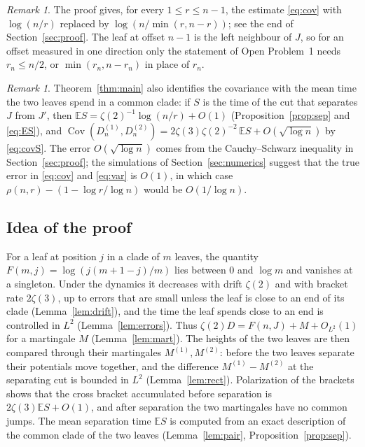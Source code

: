 \documentclass[11pt]{amsart}
\theoremstyle{remark}
\newtheorem{remark}[theorem]{Remark}
\numberwithin{equation}{section}
\newcommand{\E}{\mathbb E}
\newcommand{\Cov}{\operatorname{Cov}}
\begin{document}
\begin{remark}\label{rem:oriented}
The proof gives, for every $1\le r\le n-1$, the estimate \eqref{eq:cov} with $\log(n/r)$ replaced by $\log(n/\min(r,n-r))$; see the end of Section~\ref{sec:proof}. The leaf at offset $n-1$ is the left neighbour of $J$, so for an offset measured in one direction only the statement of Open Problem~1 needs $r_n\le n/2$, or $\min(r_n,n-r_n)$ in place of $r_n$.
\end{remark}

\begin{remark}
Theorem~\ref{thm:main} also identifies the covariance with the mean time the two leaves spend in a common clade: if $S$ is the time of the cut that separates $J$ from $J'$, then $\E S=\zeta(2)^{-1}\log(n/r)+O(1)$ (Proposition~\ref{prop:sep} and \eqref{eq:ES}), and $\Cov(D^{(1)}_n,D^{(2)}_n)=2\zeta(3)\zeta(2)^{-2}\,\E S+O(\sqrt{\log n})$ by \eqref{eq:covS}. The error $O(\sqrt{\log n})$ comes from the Cauchy--Schwarz inequality in Section~\ref{sec:proof}; the simulations of Section~\ref{sec:numerics} suggest that the true error in \eqref{eq:cov} and \eqref{eq:var} is $O(1)$, in which case $\rho(n,r)-(1-\log r/\log n)$ would be $O(1/\log n)$.
\end{remark}

\subsection*{Idea of the proof}
For a leaf at position $j$ in a clade of $m$ leaves, the quantity $F(m,j)=\log(j(m+1-j)/m)$ lies between $0$ and $\log m$ and vanishes at a singleton. Under the dynamics it decreases with drift $\zeta(2)$ and with bracket rate $2\zeta(3)$, up to errors that are small unless the leaf is close to an end of its clade (Lemma~\ref{lem:drift}), and the time the leaf spends close to an end is controlled in $L^2$ (Lemma~\ref{lem:errors}). Thus $\zeta(2)D=F(n,J)+M+O_{L^2}(1)$ for a martingale $M$ (Lemma~\ref{lem:mart}). The heights of the two leaves are then compared through their martingales $M^{(1)},M^{(2)}$: before the two leaves separate their potentials move together, and the difference $M^{(1)}-M^{(2)}$ at the separating cut is bounded in $L^2$ (Lemma~\ref{lem:rect}). Polarization of the brackets shows that the cross bracket accumulated before separation is $2\zeta(3)\E S+O(1)$, and after separation the two martingales have no common jumps. The mean separation time $\E S$ is computed from an exact description of the common clade of the two leaves (Lemma~\ref{lem:pair}, Proposition~\ref{prop:sep}).
\end{document}
